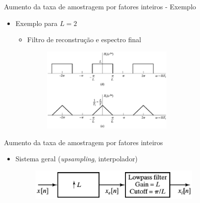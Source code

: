 \begin{slide}{Aumento da taxa de amostragem por fatores inteiros - Exemplo}
	\begin{itemize}
		\item Exemplo para $L=2$
			\begin{itemize}
		\item Filtro de reconstrução e espectro final 
			\begin{figure}
				\centering
				\includegraphics[width=0.65\textwidth]{figs/4-24de.eps}
		        \end{figure}
			\end{itemize}
	\end{itemize}
\end{slide} 
\begin{slide}{Aumento da taxa de amostragem por fatores inteiros}
	\begin{itemize}
		\item Sistema geral (\emph{upsampling}, interpolador) 
			\begin{figure}
				\centering
				\includegraphics[width=0.8\textwidth]{figs/4-23.eps}
		        \end{figure}
	\end{itemize}
\end{slide} 

